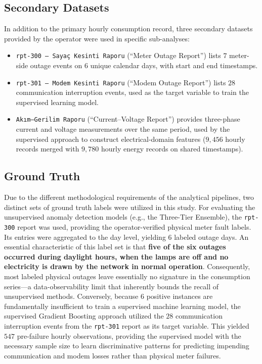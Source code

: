 \documentclass{article}
\begin{document}
\subsection{Secondary Datasets}
In addition to the primary hourly consumption record, three secondary datasets provided by the operator were used in specific sub-analyses:

\begin{itemize}[leftmargin=1.5em,itemsep=1pt]
  \item \texttt{rpt-300 --- Sayaç Kesinti Raporu} (``Meter Outage Report'') lists $7$ meter-side outage events on $6$ unique calendar days, with start and end timestamps.
  \item \texttt{rpt-301 --- Modem Kesinti Raporu} (``Modem Outage Report'') lists $28$ communication interruption events, used  as the target variable to train the supervised learning model.
  \item \texttt{Ak{\i}m--Gerilim Raporu} (``Current--Voltage Report'') provides three-phase current and voltage measurements over the same period, used by the supervised approach to construct electrical-domain features ($9{,}456$ hourly records merged with $9{,}780$ hourly energy records on shared timestamps).
\end{itemize}

\subsection{Ground Truth}
\label{subsec:groundtruth}

Due to the different methodological requirements of the analytical pipelines, two distinct sets of ground truth labels were utilized in this study. For evaluating the unsupervised anomaly detection models (e.g., the Three-Tier Ensemble), the \texttt{rpt-300} report was used, providing the operator-verified physical meter fault labels. Its entries were aggregated to the day level, yielding $6$ labeled outage days. An essential characteristic of this label set is that \textbf{five of the six outages occurred during daylight hours, when the lamps are off and no electricity is drawn by the network in normal operation}. Consequently, most labeled physical outages leave essentially no signature in the consumption series---a data-observability limit that inherently bounds the recall of unsupervised methods. Conversely, because $6$ positive instances are fundamentally insufficient to train a supervised machine learning model, the supervised Gradient Boosting approach utilized the $28$ communication interruption events from the \texttt{rpt-301} report as its target variable. This yielded $547$ pre-failure hourly observations, providing the supervised model with the necessary sample size to learn discriminative patterns for predicting impending communication and modem losses rather than physical meter failures.
\end{document}
